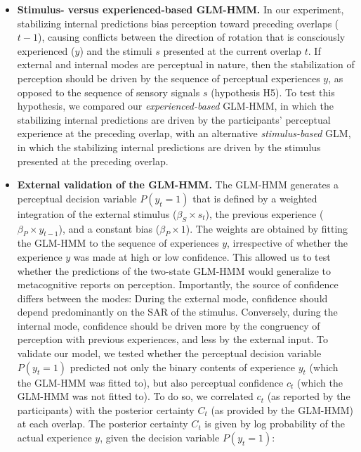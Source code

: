 \documentclass[
]{article}
\begin{document}
\begin{itemize}
\item
  \textbf{Stimulus- versus experienced-based GLM-HMM.} In our
  experiment, stabilizing internal predictions bias perception toward
  preceding overlaps (\(t-1\)), causing conflicts between the direction
  of rotation that is consciously experienced (\(y\)) and the stimuli
  \(s\) presented at the current overlap \(t\). If external and internal
  modes are perceptual in nature, then the stabilization of perception
  should be driven by the sequence of perceptual experiences \(y\), as
  opposed to the sequence of sensory signals \(s\) (hypothesis H5). To
  test this hypothesis, we compared our \emph{experienced-based}
  GLM-HMM, in which the stabilizing internal predictions are driven by
  the participants' perceptual experience at the preceding overlap, with
  an alternative \emph{stimulus-based} GLM, in which the stabilizing
  internal predictions are driven by the stimulus presented at the
  preceding overlap.
\item
  \textbf{External validation of the GLM-HMM.} The GLM-HMM generates a
  perceptual decision variable \(P(y_t = 1)\) that is defined by a
  weighted integration of the external stimulus
  (\(\beta_S \times s_t\)), the previous experience
  (\(\beta_P \times y_{t-1}\)), and a constant bias
  (\(\beta_P \times 1\)). The weights are obtained by fitting the
  GLM-HMM to the sequence of experiences \(y\), irrespective of whether
  the experience \(y\) was made at high or low confidence. This allowed
  us to test whether the predictions of the two-state GLM-HMM would
  generalize to metacognitive reports on perception. Importantly, the
  source of confidence differs between the modes: During the external
  mode, confidence should depend predominantly on the SAR of the
  stimulus. Conversely, during the internal mode, confidence should be
  driven more by the congruency of perception with previous experiences,
  and less by the external input. To validate our model, we tested
  whether the perceptual decision variable \(P(y_t = 1)\) predicted not
  only the binary contents of experience \(y_t\) (which the GLM-HMM was
  fitted to), but also perceptual confidence \(c_t\) (which the GLM-HMM
  was not fitted to). To do so, we correlated \(c_t\) (as reported by
  the participants) with the posterior certainty \(C_t\) (as provided by
  the GLM-HMM) at each overlap. The posterior certainty \(C_t\) is given
  by log probability of the actual experience \(y\), given the decision
  variable \(P(y_t = 1)\):
\end{itemize}
\end{document}
